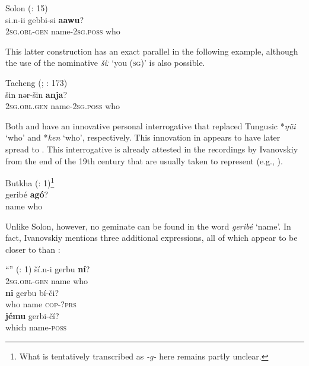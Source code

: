 \documentclass[output=paper,colorlinks,citecolor=brown]{langscibook}
\begin{document}
\ea
    \label{example4.66}
     Solon (\citealt{Tsumagari2009a}: 15)\\
    \gll si.n-ii			gebbi-si			\textbf{aawu}?\\
    2\textsc{sg.obl-gen}		name-2\textsc{sg.poss}		who\\
\z

\noindent This latter construction has an exact parallel in the following  example, although the use of the nominative \textit{šiː} ‘you (\textsc{sg})’ is also possible.

\ea
    \label{example4.67}
    Tacheng  (; \citealt{Yu2008}: 173)\\
    \gll šin				nər-šin			\textbf{anja}?\\
    2\textsc{sg.obl.gen}		name-2\textsc{sg.poss}		who\\
    \z

\noindent Both  and  have an innovative personal interrogative that replaced Tungusic *\textit{ŋüi} ‘who’ and  *\textit{ken} ‘who’, respectively. This innovation in  appears to have later spread to . This interrogative is already attested in the recordings by Ivanovskiy from the end of the 19th century that are usually taken to represent  (e.g., \citealt{Lie1978}).

\ea
    \label{example4.68}
    Butkha  (\citealt{Ivanovskiy1982}: 1)\footnote{What is tentatively transcribed as \textit{-g-} here remains partly unclear.}\\
    \gll geribé		\textbf{agó}?\\
    name		who\\
    \z

\noindent Unlike  Solon, however, no geminate can be found in the word \textit{geribé} ‘name’. In fact, Ivanovskiy mentions three additional expressions, all of which appear to be closer to  than :

\ea
    \label{example4.69}
    ``'' (\citealt{Ivanovskiy1982}: 1)
    \ea
    \gll ší.n-i			gerbu 		\textbf{ní}?\\
    2\textsc{sg.obl-gen}		name		who\\

    \ex
    \gll \textbf{ni}		gerbu	bí-či?\\
    who		name	\textsc{cop-?prs}\\

    \ex
    \gll \textbf{jému}	gerbi-čí?\\
    which	name-\textsc{poss}\\
    \z
\z
\end{document}
